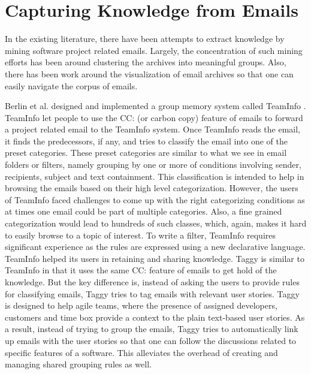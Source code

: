 \section{Capturing Knowledge from Emails}
In the existing literature, there have been attempts to extract knowledge by mining software project related emails. Largely, the concentration of such mining efforts has been around clustering the archives into meaningful groups. Also, there has been work around the visualization of email archives so that one can easily navigate the corpus of emails.

Berlin et al. designed and implemented a group memory system called TeamInfo \cite{where_did_you}. TeamInfo let people to use the CC: (or carbon copy) feature of emails to forward a project related email to the TeamInfo system. Once TeamInfo reads the email, it finds the predecessors, if any, and tries to classify the email into one of the preset categories. These preset categories are similar to what we see in email folders or filters, namely grouping by one or more of conditions involving sender, recipients, subject and text containment. This classification is intended to help in browsing the emails based on their high level categorization. However, the users of TeamInfo faced challenges to come up with the right categorizing conditions as at times one email could be part of multiple categories. Also, a fine grained categorization would lead to hundreds of such classes, which, again, makes it hard to easily browse to a topic of interest. To write a filter, TeamInfo requires significant experience as the rules are expressed using a new declarative language. TeamInfo helped its users in retaining and sharing knowledge. Taggy is similar to TeamInfo in that it uses the same CC: feature of emails to get hold of the knowledge. But the key difference is, instead of asking the users to provide rules for classifying emails, Taggy tries to tag emails with relevant user stories. Taggy is designed to help agile teams, where the presence of assigned developers, customers and time box provide a context to the plain text-based user stories. As a result, instead of trying to group the emails, Taggy tries to automatically link up emails with the user stories so that one can follow the discussions related to specific features of a software. This alleviates the overhead of creating and managing shared grouping rules as well.

